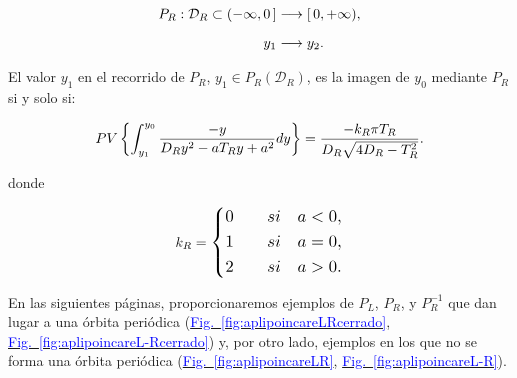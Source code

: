 \documentclass[12pt,a4paper]{report} %
\newcommand{\fref}[1]{\hyperref[#1]{\textcolor{blue}{Fig.~\ref*{#1}}}}
\begin{document}
	\begin{equation}
		\label{eq:dr}
		\scalebox{1}{$\displaystyle
			\begin{aligned}
				P_R:\mathcal{D}_R\subset (-\infty,0\,] &\longrightarrow [\,0, +\infty),\\[2mm]
				y_1 &\longrightarrow y_2.
			\end{aligned}
			$}
	\end{equation}\smallskip
	
	\noindent El valor $y_1$ en el recorrido de $P_R$, $y_1 \in P_R(\mathcal{D}_R)$, es la imagen de $y_0$ mediante $P_R$ si y solo si:
	
	\vspace{0.5cm}\begin{equation}
		\label{eq:caracr}
		\scalebox{1}{$\displaystyle
			PV\left\{\int_{y_1}^{y_0}\frac{-y}{D_Ry^2-aT_Ry+a^2}dy\right\}=\frac{-k_R\pi T_R}{D_R\sqrt{4D_R-T_R^2}}.
			$}
	\end{equation}\smallskip
	
	\noindent donde
	
	\begin{equation*}
		k_R=
		\label{eq:kr}
		\scalebox{1.2}{$\displaystyle
			\left\{
			\begin{aligned}
				0 \qquad si \quad a<0, \\
				1 \qquad si \quad a=0, \\
				2 \qquad si \quad a>0. 
			\end{aligned}
			\right. 
			$}
	\end{equation*}\smallskip
	
	\vspace{1cm}\noindent En las siguientes páginas, proporcionaremos ejemplos de $P_L$, $P_R$, y $P_R^{-1}$ que dan lugar a una órbita periódica (\fref{fig:aplipoincareLRcerrado}, \fref{fig:aplipoincareL-Rcerrado}) y, por otro lado, ejemplos en los que no se forma una órbita periódica (\fref{fig:aplipoincareLR}, \fref{fig:aplipoincareL-R}).
	
	\newpage
	
\end{document}
